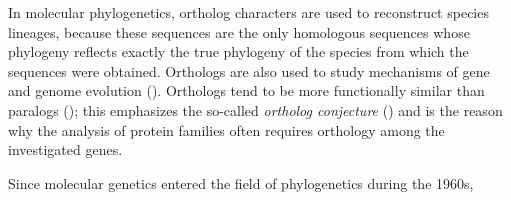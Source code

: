 In molecular phylogenetics, ortholog characters are used to reconstruct species
lineages, because these sequences are the only homologous sequences whose
phylogeny reflects exactly the true phylogeny of the species from which the
sequences were obtained. Orthologs are also used to study mechanisms of gene and
genome evolution (\cite{dessimoz2012}). Orthologs tend to be more functionally
similar than paralogs (\cite{altenhoff2012}); this emphasizes the so-called
\emph{ortholog conjecture} (\cite{tatusov1997}) and is the reason why the
analysis of protein families often requires orthology among the investigated
genes.




Since molecular genetics entered the field of phylogenetics during the 1960s,

